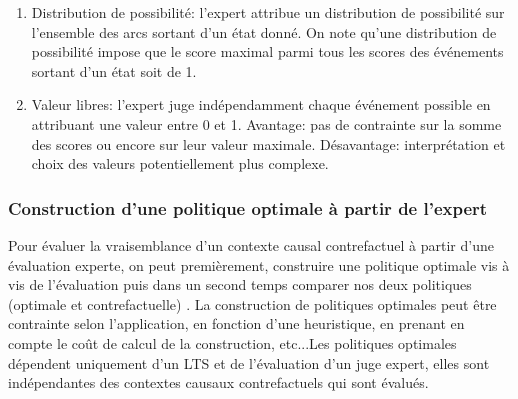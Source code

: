 \documentclass[11pt]{extarticle}
\begin{document}
\begin{enumerate}
    \item Distribution de possibilité: l'expert attribue un distribution de possibilité sur l'ensemble des arcs sortant d'un état donné. On note qu'une distribution de possibilité impose que le score maximal parmi tous les scores des événements sortant d'un état soit de 1.
    \item Valeur libres: l'expert juge indépendamment chaque événement possible en attribuant une valeur entre 0 et 1. Avantage: pas de contrainte sur la somme des scores ou encore sur leur valeur maximale. Désavantage: interprétation et choix des valeurs potentiellement plus complexe.  
        
\end{enumerate}
 \subsubsection{Construction d'une politique optimale à partir de l'expert}
 Pour évaluer la vraisemblance d'un contexte causal contrefactuel à partir d'une évaluation experte, on peut premièrement, construire une politique optimale vis à vis de l'évaluation puis dans un second temps comparer nos deux politiques (optimale et contrefactuelle) . La construction de politiques optimales peut être contrainte selon l'application, en fonction d'une heuristique, en prenant en compte le coût de calcul de la construction, etc...Les politiques optimales dépendent uniquement d'un LTS et de l'évaluation d'un juge expert, elles sont indépendantes des contextes causaux contrefactuels qui sont évalués.
\end{document}
